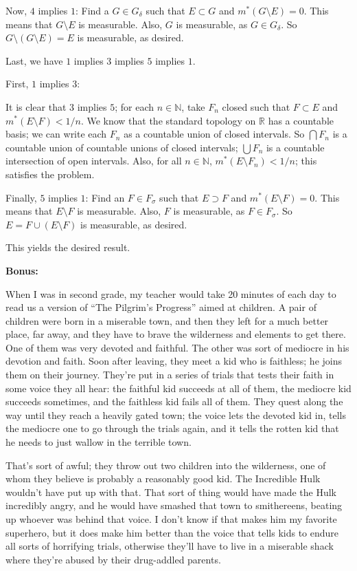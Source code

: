 \documentclass[a4paper,12pt]{article}
\newcommand{\tab}{\hspace{4mm}} %
\newcommand{\shunt}{\vspace{20mm}}
\newcommand{\de}{\delta}
\newcommand{\si}{\sigma}
\newcommand{\N}{\mathbb{N}}
\newcommand{\R}{\mathbb{R}}
\begin{document}
\tab Now, $4$ implies $1$: Find a $G \in G_\de$ such that $E \subset G$ and $m^*(G \setminus E) = 0$. This means that $G \setminus E$ is measurable. Also, $G$ is measurable, as $G \in G_\de$. So $G \setminus (G \setminus E) = E$ is measurable, as desired.

Last, we have $1$ implies $3$ implies $5$ implies $1$.

\tab First, $1$ implies $3$:

\tab It is clear that $3$ implies $5$; for each $n \in \N$, take $F_n$ closed such that $F \subset E$ and $m^*(E \setminus F) < 1/n$. We know that the standard topology on $\R$ has a countable basis; we can write each $F_n$ as a countable union of closed intervals. So $\bigcap F_n$ is a countable union of countable unions of closed intervals; $\bigcup F_n$ is a countable intersection of open intervals. Also, for all $n \in \N$, $m^*(E \setminus F_n) < 1/n$; this satisfies the problem.

\tab Finally, $5$ implies $1$: Find an $F \in F_\si$ such that $E \supset F$ and $m^*(E \setminus F) = 0$. This means that $E \setminus F$ is measurable. Also, $F$ is measurable, as $F \in F_\si$. So $E = F \cup (E \setminus F)$ is measurable, as desired.

This yields the desired result.


\shunt

{\bf Bonus:}

When I was in second grade, my teacher would take 20 minutes of each day to read us a version of ``The Pilgrim's Progress'' aimed at children. A pair of children were born in a miserable town, and then they left for a much better place, far away, and they have to brave the wilderness and elements to get there. One of them was very devoted and faithful. The other was sort of mediocre in his devotion and faith. Soon after leaving, they meet a kid who is faithless; he joins them on their journey. They're put in a series of trials that tests their faith in some voice they all hear: the faithful kid succeeds at all of them, the mediocre kid succeeds sometimes, and the faithless kid fails all of them. They quest along the way until they reach a heavily gated town; the voice lets the devoted kid in, tells the mediocre one to go through the trials again, and it tells the rotten kid that he needs to just wallow in the terrible town.

That's sort of awful; they throw out two children into the wilderness, one of whom they believe is probably a reasonably good kid. The Incredible Hulk wouldn't have put up with that. That sort of thing would have made the Hulk incredibly angry, and he would have smashed that town to smithereens, beating up whoever was behind that voice. I don't know if that makes him my favorite superhero, but it does make him better than the voice that tells kids to endure all sorts of horrifying trials, otherwise they'll have to live in a miserable shack where they're abused by their drug-addled parents.
\shunt
\end{document}

